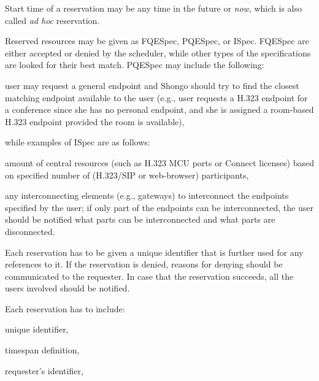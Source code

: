 \documentclass[a4paper]{report}
\makeatletter
\newcounter{UCcounter}
\newenvironment{UseCases}%
	{\begin{list}{\textbf{UC-\arabic{UCcounter}}}{\@nmbrlisttrue\def\@listctr{UCcounter}}}%
	{\end{list}}
\makeatother
\begin{document}
\begin{UseCases}
Start time of a reservation may be any time in the future or \emph{now}, which
is also called \emph{ad hoc} reservation.

Reserved resources may be given as FQESpec, PQESpec, or ISpec. FQESpec are
either accepted or denied by the scheduler, while other types of the
specifications are looked for their best match. PQESpec may include the
following:

\begin{compactitem}

\item user may request a general endpoint and Shongo should try to find the
closest matching endpoint available to the user (e.g., user requests a H.323
endpoint for a conference since she has no personal endpoint, and she is
assigned a room-based H.323 endpoint provided the room is available),

\end{compactitem}

while examples of ISpec are as follows:

\begin{compactitem}

\item amount of central resources (such as H.323 MCU ports or Connect licenses)
based on specified number of (H.323/SIP or web-browser) participants,

\item any interconnecting elements (e.g., gateways) to interconnect the
endpoints specified by the user; if only part of the endpoints can be
interconnected, the user should be notified what parts can be interconnected
and what parts are disconnected.

\end{compactitem}

Each reservation has to be given a unique identifier that is further used for
any references to it. If the reservation is denied, reasons for denying should
be communicated to the requester. In case that the reservation succeeds, all
the users involved should be notified.


Each reservation has to include:

\begin{compactitem}

\item unique identifier,

\item timespan definition,

\item requester's identifier,


\end{compactitem}
\end{UseCases}
\end{document}
